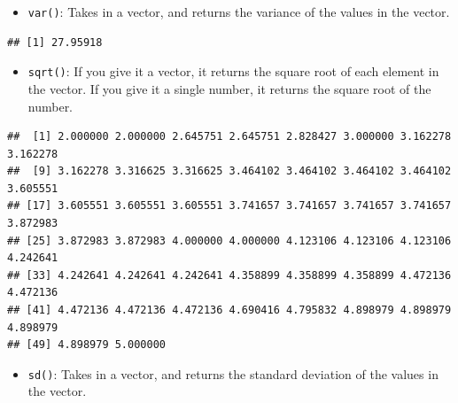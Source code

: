 \documentclass[
]{book}
\newenvironment{Shaded}{\begin{snugshade}}{\end{snugshade}}
\newcommand{\KeywordTok}[1]{\textcolor[rgb]{0.13,0.29,0.53}{\textbf{#1}}}
\newcommand{\NormalTok}[1]{#1}
\newcommand{\OperatorTok}[1]{\textcolor[rgb]{0.81,0.36,0.00}{\textbf{#1}}}
\providecommand{\tightlist}{%
  \setlength{\itemsep}{0pt}\setlength{\parskip}{0pt}}
\begin{document}
\begin{itemize}
\tightlist
\item
  \texttt{var()}: Takes in a vector, and returns the variance of the values in the vector.
\end{itemize}

\begin{Shaded}
\end{Shaded}

\begin{verbatim}
## [1] 27.95918
\end{verbatim}

\begin{itemize}
\tightlist
\item
  \texttt{sqrt()}: If you give it a vector, it returns the square root of each element in the vector. If you give it a single number, it returns the square root of the number.
\end{itemize}

\begin{Shaded}
\end{Shaded}

\begin{verbatim}
##  [1] 2.000000 2.000000 2.645751 2.645751 2.828427 3.000000 3.162278 3.162278
##  [9] 3.162278 3.316625 3.316625 3.464102 3.464102 3.464102 3.464102 3.605551
## [17] 3.605551 3.605551 3.605551 3.741657 3.741657 3.741657 3.741657 3.872983
## [25] 3.872983 3.872983 4.000000 4.000000 4.123106 4.123106 4.123106 4.242641
## [33] 4.242641 4.242641 4.242641 4.358899 4.358899 4.358899 4.472136 4.472136
## [41] 4.472136 4.472136 4.472136 4.690416 4.795832 4.898979 4.898979 4.898979
## [49] 4.898979 5.000000
\end{verbatim}

\begin{itemize}
\tightlist
\item
  \texttt{sd()}: Takes in a vector, and returns the standard deviation of the values in the vector.
\end{itemize}

\begin{Shaded}
\end{Shaded}
\end{document}
